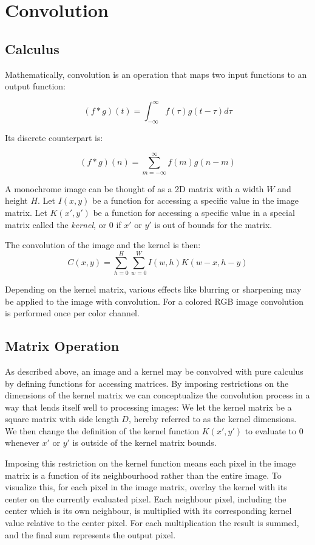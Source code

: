 \section{Convolution}
\subsection{Calculus}
Mathematically, convolution is an operation that maps two input functions to an output function:

\[
    (f * g)(t) = \int^{\infty}_{-\infty}{f(\tau)g(t-\tau) d\tau}
\]

Its discrete counterpart is:

\[
    (f * g)(n) = \sum^{\infty}_{m=-\infty}{f(m)g(n-m)}
\]

A monochrome image can be thought of as a 2D matrix with a width $W$ and height $H$.
Let $I(x, y)$ be a function for accessing a specific value in the image matrix.
Let $K(x', y')$ be a function for accessing a specific value in a special matrix called the \textit{kernel},
or $0$ if $x'$ or $y'$ is out of bounds for the matrix.

The convolution of the image and the kernel is then:
\[
    C(x, y) = \sum^{H}_{h=0} \sum^{W}_{w=0}{I(w, h)K(w - x, h -y)}
\]

Depending on the kernel matrix,
various effects like blurring or sharpening may be applied to the image with convolution.
For a colored RGB image convolution is performed once per color channel.

\subsection{Matrix Operation}
As described above, an image and a kernel may be convolved with pure calculus by defining functions for accessing matrices.
By imposing restrictions on the dimensions of the kernel matrix we can conceptualize the convolution process in a way that lends itself well to processing images:
We let the kernel matrix be a square matrix with side length $D$, hereby referred to as the kernel dimensions.
We then change the definition of the kernel function $K(x', y')$ to evaluate to $0$ whenever $x'$ or $y'$ is outside of the kernel matrix bounds.

Imposing this restriction on the kernel function means each pixel in the image matrix is a function of its neighbourhood rather than the entire image.
To visualize this, for each pixel in the image matrix, overlay the kernel with its center on the currently evaluated pixel.
Each neighbour pixel, including the center which is its own neighbour, is multiplied with its corresponding kernel value relative to the center pixel.
For each multiplication the result is summed, and the final sum represents the output pixel. 

